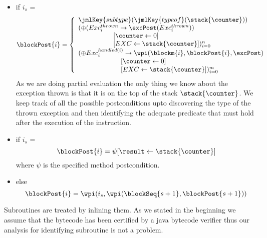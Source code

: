 \begin{defn}
\begin{itemize}
\item  if  $i_s$ =   \\ 
$$
\blockPost{i }  \\ 
 =   \left\{ \begin{array}{l} 
		\jmlKey{subtype}( \jmlKey{ typeof}(\stack{\counter} )) \\
		(\oplus (Exc_{i}^{thrown} \rightarrow \excPost(Exc_{i}^{thrown}) ) \\
		\phantom{\oplus Exc^{thrown} } [\counter \leftarrow  0] \\ 
		\phantom{ \oplus Exc^{thrown} } [EXC \leftarrow  \stack{\counter} ] )_{i=0}^{n}   \\
		(\oplus Exc_{i}^{handled(i)} \rightarrow \wpi(\blockm{i}, \blockPost{i}, \excPost )\\
		\phantom{\oplus Exc^{handled(i)} }  [\counter \leftarrow  0] \\ 
		\phantom{ \oplus Exc^{handled(i)}}   [EXC \leftarrow  \stack{\counter} ] )_{i=0}^{m} \\
		\end{array} \right.
$$
As we are doing partial evaluation the only thing we know about the exception thrown is that it is 
on the top of the stack $\stack{\counter}$. We keep track of all the possible postconditions upto
discovering the type of the thrown exception and then identifying the adequate predicate 
that must hold after the execution of the  instruction.
\item  if  $i_s$ =  \\
$$
   \blockPost{i } = \psi[\result \leftarrow \stack{\counter} ]    
$$
where $\psi $ is the specified method postcondition.
\item  else  
 $$ \blockPost{i} =  \wpi(  i_s , \wpi( \blockSeq{s+1} ,  \blockPost{ s  +1} ) )  $$ 
 \end{itemize}
\end{defn}

Subroutines are treated by inlining them. As we stated in the beginning we assume that the bytecode has been certified by a java
bytecode verifier thus our analysis for identifying  subroutine is not a problem.  

